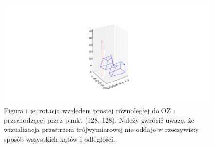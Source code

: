 \begin{figure}[!ht]
\centerline{
\includegraphics[scale=0.75]{images/3d_12}}
\caption{Figura i jej rotacja względem prostej równoległej do OZ i przechodzącej przez punkt (128, 128). Należy zwrócić uwagę, że wizualizacja przestrzeni trójwymiarowej nie oddaje w rzeczywisty sposób wszystkich kątów i odległości.}
\end{figure}

